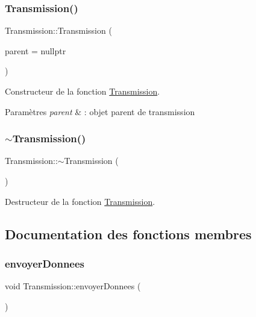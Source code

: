 \subsubsection{\texorpdfstring{Transmission()}{Transmission()}}
{\footnotesize\ttfamily Transmission\+::\+Transmission (\begin{DoxyParamCaption}\item[{Q\+Object $\ast$}]{parent = {\ttfamily nullptr} }\end{DoxyParamCaption})\hspace{0.3cm}{\ttfamily [explicit]}}



Constructeur de la fonction \hyperlink{classTransmission}{Transmission}. 


\begin{DoxyParams}{Paramètres}
{\em parent} & \+: objet parent de transmission \\
\hline
\end{DoxyParams}
\mbox{\label{classTransmission_adcdc6012d99ddb1d0c3159d50984e146}} 
\subsubsection{\texorpdfstring{$\sim$\+Transmission()}{~Transmission()}}
{\footnotesize\ttfamily Transmission\+::$\sim$\+Transmission (\begin{DoxyParamCaption}{ }\end{DoxyParamCaption})}



Destructeur de la fonction \hyperlink{classTransmission}{Transmission}. 



\subsection{Documentation des fonctions membres}
\mbox{\label{classTransmission_a14b885539e973a158c9c4c25fd99bc04}} 
\subsubsection{\texorpdfstring{envoyer\+Donnees}{envoyerDonnees}}
{\footnotesize\ttfamily void Transmission\+::envoyer\+Donnees (\begin{DoxyParamCaption}{ }\end{DoxyParamCaption})\hspace{0.3cm}{\ttfamily [slot]}}



